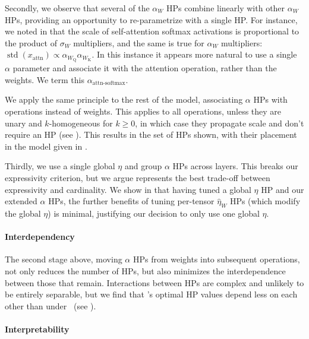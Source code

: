 Secondly, we observe that several of the $\alpha_W$ HPs combine linearly with other $\alpha_W$ HPs, providing an opportunity to re-parametrize with a single HP. For instance, we noted in  that the scale of self-attention softmax activations is proportional to the product of $\sigma_W$ multipliers, and the same is true for $\alpha_W$ multipliers: $\operatorname{std}(x_\mathrm{attn}) \propto \alpha_{W_\mathrm{Q}}\alpha_{W_\mathrm{K}}$. In this instance it appears more natural to use a single $\alpha$ parameter and associate it with the attention operation, rather than the weights. We term this $\alpha_\mathrm{attn\text{-}softmax}$.

We apply the same principle to the rest of the model, associating $\alpha$ HPs with operations instead of weights. This applies to all operations, unless they are unary and $k$-homogeneous for $k \ge 0$, in which case they propagate scale and don't require an HP (see ). This results in the set of HPs shown, with their placement in the model given in .

Thirdly, we use a single global $\eta$ and group $\alpha$ HPs across layers. This breaks our expressivity criterion, but we argue represents the best trade-off between expressivity and cardinality. We show in  that having tuned a global $\eta$ HP and our extended $\alpha$ HPs, the further benefits of tuning per-tensor $\hat{\eta}_W$ HPs (which modify the global $\eta$) is minimal, justifying our decision to only use one global $\eta$.

\paragraph{Interdependency}

The second stage above, moving $\alpha$ HPs from weights into subsequent operations, not only reduces the number of HPs, but also minimizes the interdependence between those that remain. Interactions between HPs are complex and unlikely to be entirely separable, but we find that \umup's optimal HP values depend less on each other than under \mup\ (see ).

\paragraph{Interpretability} 


